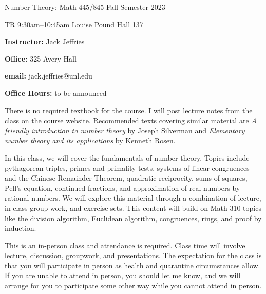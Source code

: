 \documentclass{amsart}
\begin{document}
 








\centerline{\bigbf Number Theory: Math 445/845 Fall Semester 2023}
\centerline{\bigbf TR 9:30am–10:45am Louise Pound Hall 137}


\bigskip


\begin{multicols}{2}
\noindent
{\bf Instructor:}  Jack Jeffries

\noindent
{\bf Office:} 325 Avery Hall

\noindent
{\bf email:} jack.jeffries@unl.edu

\noindent
{\bf Office Hours:} to be announced
\end{multicols}




There is no required textbook for the course. I will post lecture notes from the class on the course website. Recommended texts covering similar material are
\emph{A friendly introduction to number theory} by Joseph Silverman and
\emph{Elementary number theory and its applications} by Kenneth Rosen.


\medskip


In this class, we will cover the fundamentals of number theory. Topics include pythagorean triples, primes and primality tests, systems of linear congruences and the Chinese Remainder Theorem, quadratic reciprocity, sums of squares, Pell's equation, continued fractions, and approximation of real numbers by rational numbers. We will explore this material through a combination of lecture, in-class group work, and exercise sets. This content will build on Math 310 topics like the division algorithm, Euclidean algorithm, congruences, rings, and proof by induction.


\smallskip

This is an in-person class and attendance is required. Class time will involve lecture, discussion, groupwork, and presentations. The expectation for the class is that you will participate in person as health and quarantine circumstances allow. If you are unable to attend in person, you should let me know, and we will arrange for you to participate some other way while you cannot attend in person.
\end{document}
